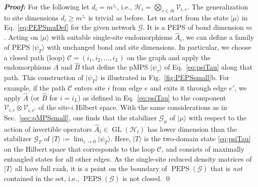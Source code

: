 \documentclass[english,11pt,aps,pra,onecolumn,tightenlines,groupedaddress,superscriptaddress,notitlepage,floatfix,fleqn]{revtex4-1}
\newcommand{\ket}{\rangle}
\newcommand{\hA}{\hat{A}}
\newcommand{\hB}{\hat{B}}
\newcommand{\mc}[1]{\mathcal{#1}}
\renewcommand{\H}{\mc{H}}
\newcommand{\V}{\mc{V}}
\newcommand{\G}{\mc{G}}
\newcommand{\PEPS}{\operatorname{PEPS}}
\newcommand{\GL}{\operatorname{GL}}
\newcommand{\veps}{\varepsilon}
\newcommand{\Emph}[1]{\textbf{\emph{#1}}}
\begin{document}
\Emph{Proof:}
For the following let $d_i=m^{z_i}$, i.e., $\H_i=\bigotimes_{e\in\partial i}\V_{i,e}$. The generalization to site dimensions $d_i\geq m^{z_i}$ is trivial as before. Let us start from the state $|\mu\ket$ in Eq.~\eqref{eq:PEPSmuDef} for the given network $\G$. It is a PEPS of bond dimension $m$. Acting on $|\mu\ket$ with suitable single-site endomorphisms $\hA_i$, we can define a family of PEPS $|\psi_T\ket$ with unchanged bond and site dimensions. In particular, we choose a closed path (loop) $\mc{C}=(i_1,i_2,\dotsc,i_{L})$ on the graph and apply the endomorphisms $\hA$ and $\hB$ that define the pMPS $|\psi_\tau\ket$ of Eq.~\eqref{eq:psiTau} along that path. This construction of $|\psi_T\ket$ is illustrated in Fig.~\ref{fig:PEPSsmall}b. For example, if the path $\mc{C}$ enters site $i$ from edge $e$ and exits it through edge $e'$, we apply $\hA$ (or $\hB$ for $i=i_{L}$) as defined in Eq.~\eqref{eq:psiTau} to the component $\V_{i,e}\otimes\V_{i,e'}$ of the site-$i$ Hilbert space. With the same considerations as in Sec.~\ref{sec:pMPSsmall}, one finds that the stabilizer $\G_\mu$ of $|\mu\ket$ with respect to the action of invertible operators $\hA_i\in\GL(\H_i)$ has lower dimension than the stabilizer $\G_T$ of $|T\ket:=\lim_{\veps\to 0}|\psi_T\ket$. Here, $|T\ket$ is the two-domain state \eqref{eq:psiTau} on the Hilbert space that corresponds to the loop $\mc{C}$, and consists of maximally entangled states for all other edges. As the single-site reduced density matrices of $|T\ket$ all have full rank, it is a point on the boundary of $\PEPS(\G)$ that is \emph{not} contained in the set, i.e., $\PEPS(\G)$ is not closed. \qed
\end{document}
